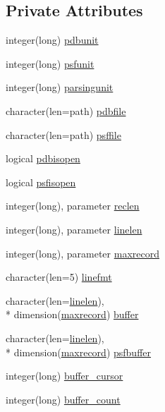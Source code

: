 \subsection*{Private Attributes}
\begin{DoxyCompactItemize}
\item 
integer(long) \hyperlink{classmolreader_a5b0570862e5318937ea68a01966ed56f}{pdbunit}
\item 
integer(long) \hyperlink{classmolreader_a2b57a032db6161c98961f5e8109c3b90}{psfunit}
\item 
integer(long) \hyperlink{classmolreader_ac41219b2f68591f315dded4488483263}{parsingunit}
\item 
character(len=path) \hyperlink{classmolreader_aa372f060e4e581b1c14e2b46a65d2df4}{pdbfile}
\item 
character(len=path) \hyperlink{classmolreader_a48ac5c969e35417342bb66a57adec842}{psffile}
\item 
logical \hyperlink{classmolreader_ad7636360c8e0ecb526000567dd32d2d0}{pdbisopen}
\item 
logical \hyperlink{classmolreader_ae5cd9063d12a39b0e8266e184439c808}{psfisopen}
\item 
integer(long), parameter \hyperlink{classmolreader_a8f12be3272b946fd698c9fbaf2ba9d32}{reclen}
\item 
integer(long), parameter \hyperlink{classmolreader_acd493d996a1fcd0ed77937e925c9b7fe}{linelen}
\item 
integer(long), parameter \hyperlink{classmolreader_a7192fdfba4bcb0ee7504a9c6695c7106}{maxrecord}
\item 
character(len=5) \hyperlink{classmolreader_ac14650c697f68fd15530b93807e3f42f}{linefmt}
\item 
character(len=\hyperlink{classmolreader_acd493d996a1fcd0ed77937e925c9b7fe}{linelen}), \\*
dimension(\hyperlink{classmolreader_a7192fdfba4bcb0ee7504a9c6695c7106}{maxrecord}) \hyperlink{classmolreader_a06d78b69405420664607fb01b4d8e97a}{buffer}
\item 
character(len=\hyperlink{classmolreader_acd493d996a1fcd0ed77937e925c9b7fe}{linelen}), \\*
dimension(\hyperlink{classmolreader_a7192fdfba4bcb0ee7504a9c6695c7106}{maxrecord}) \hyperlink{classmolreader_aab845daa54f6803a37ceb91d7ad296a7}{psfbuffer}
\item 
integer(long) \hyperlink{classmolreader_a7b2e4f11efe55d80469efa3f7aeacbab}{buffer\-\_\-cursor}
\item 
integer(long) \hyperlink{classmolreader_ac7969154d301aab4a51cde89ec2f08ee}{buffer\-\_\-count}

\end{DoxyCompactItemize}

